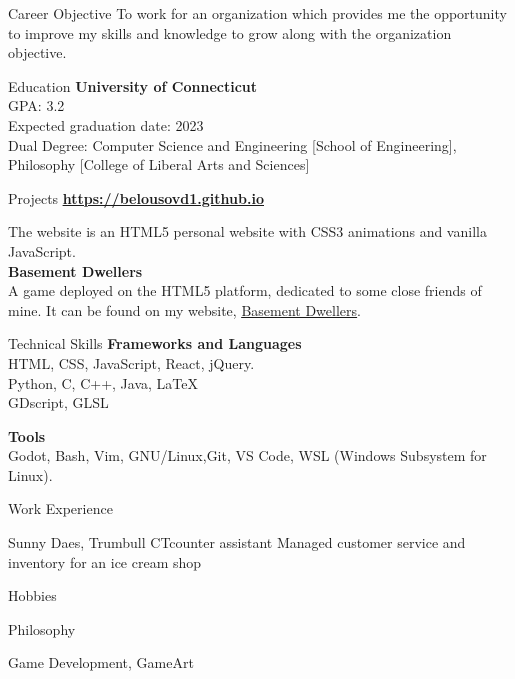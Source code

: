 \documentclass{resume}
\begin{document}
\begin{rSection}{Career Objective}
 To work for an organization which provides me the opportunity to improve my skills and knowledge to grow along with the organization objective.
\end{rSection}

\begin{rSection}{Education}
{\bf University of Connecticut} 
\\ GPA: 3.2
\\ Expected graduation date:   2023
\\ Dual Degree: Computer Science and Engineering [School of Engineering], Philosophy [College of Liberal Arts and Sciences]
\end{rSection}


\begin{rSection}{Projects}
{\bf \underline{\href{https://belousovd1.github.io}{https://belousovd1.github.io}}}

The website is an HTML5 personal website with CSS3 animations and vanilla JavaScript.\\

{\bf Basement Dwellers}\\
A game deployed on the HTML5 platform, dedicated to some close friends of mine. It can be found on my website,
\underline{\href{https://belousovd1.github.io./Basement\_Dwellers.html}{Basement Dwellers}}.
\end{rSection}

\begin{rSection}{Technical Skills}
{\bf Frameworks and Languages}\\
HTML, CSS, JavaScript, React, jQuery. \\
Python, C, C++, Java, LaTeX  \\ 
GDscript, GLSL  

{\bf Tools} \\
Godot, Bash, Vim, GNU/Linux,Git, VS Code, WSL (Windows Subsystem for Linux). \\
\end{rSection}

\begin{rSection}{Work Experience}
\begin{rSubsection}{Sunny Daes, Trumbull CT}{}{counter assistant}{}
Managed customer service and inventory for an ice cream shop
\end{rSubsection}
\end{rSection}

\begin{rSection}{Hobbies}
\item Philosophy
\item Game Development, GameArt
\end{rSection}
\end{document}
